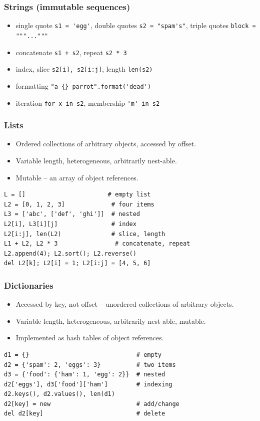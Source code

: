 \begin{frame}[fragile]\frametitle{Strings (immutable sequences)}
	\begin{itemize}
	\item single quote \lstinline{s1 = 'egg'}, double quotes \lstinline{s2 = "spam's"}, triple quotes \lstinline{block = """..."""}
	\item concatenate \lstinline{s1 + s2}, repeat \lstinline{s2 * 3}
	\item index, slice \lstinline{s2[i], s2[i:j]}, length \lstinline{len(s2)}
	\item formatting \lstinline|"a {} parrot".format('dead')|
	\item iteration \lstinline{for x in s2}, membership \lstinline{'m' in s2}
	\end{itemize}
\end{frame}

\begin{frame}[fragile]\frametitle{Lists}
	\begin{itemize}
	\item Ordered collections of arbitrary objects, accessed by offset.
	\item Variable length, heterogeneous, arbitrarily nest-able.
	\item Mutable -- an array of object references.
	\end{itemize}
\begin{lstlisting}
L = []                       # empty list
L2 = [0, 1, 2, 3]             # four items
L3 = ['abc', ['def', 'ghi']]  # nested
L2[i], L3[i][j]               # index
L2[i:j], len(L2)              # slice, length
L1 + L2, L2 * 3                # concatenate, repeat
L2.append(4); L2.sort(); L2.reverse()
del L2[k]; L2[i] = 1; L2[i:j] = [4, 5, 6]
\end{lstlisting}
\end{frame}

\begin{frame}[fragile]\frametitle{Dictionaries}
	\begin{itemize}
	\item Accessed by key, not offset -- unordered collections of arbitrary objects.
	\item Variable length, heterogeneous, arbitrarily nest-able, mutable.
	\item Implemented as hash tables of object references.
	\end{itemize}
\begin{lstlisting}
d1 = {}                              # empty
d2 = {'spam': 2, 'eggs': 3}          # two items
d3 = {'food': {'ham': 1, 'egg': 2}}  # nested
d2['eggs'], d3['food']['ham']        # indexing
d2.keys(), d2.values(), len(d1)
d2[key] = new                        # add/change
del d2[key]                          # delete
\end{lstlisting}
\end{frame}

